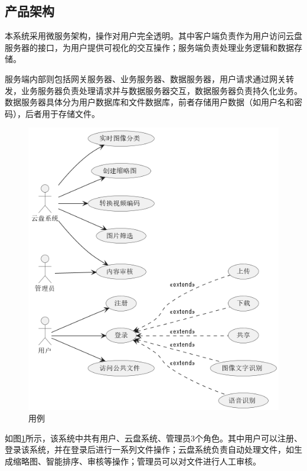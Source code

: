 \subsection{产品架构}

本系统采用微服务架构，操作对用户完全透明。其中客户端负责作为用户访问云盘服务器的接口，为用户提供可视化的交互操作；服务端负责处理业务逻辑和数据存储。

服务端内部则包括网关服务器、业务服务器、数据服务器，用户请求通过网关转发，业务服务器负责处理请求并与数据服务器交互，数据服务器负责持久化业务。数据服务器具体分为用户数据库和文件数据库，前者存储用户数据（如用户名和密码），后者用于存储文件。

\begin{figure}[H]
    \begin{center}
        \includegraphics[scale=0.5]{examples/用例图.png}
        \caption{用例}
        \label{fig:usercase}
    \end{center}
\end{figure}

如图\ref{fig:usercase}所示，该系统中共有用户、云盘系统、管理员3个角色。其中用户可以注册、登录该系统，并在登录后进行一系列文件操作；云盘系统负责自动处理文件，如生成缩略图、智能排序、审核等操作；管理员可以对文件进行人工审核。

